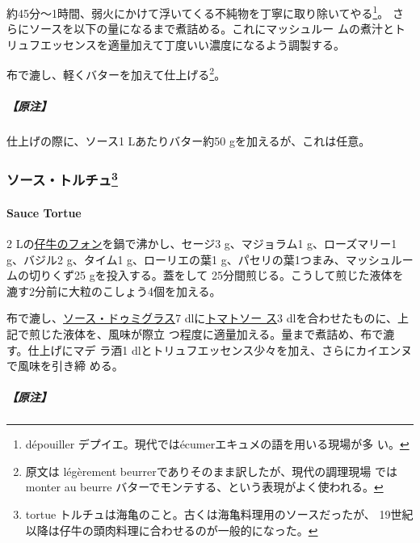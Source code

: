 \begin{recette}
約45分〜1時間、弱火にかけて浮いてくる不純物を丁寧に取り除いてやる\footnote{dépouiller
  デプイエ。現代ではécumerエキュメの語を用いる現場が多 い。}。
さらにソースを\deuxtiers{}以下の量になるまで煮詰める。これにマッシュルー
ムの煮汁とトリュフエッセンスを適量加えて丁度いい濃度になるよう調製する。

布で漉し、軽くバターを加えて仕上げる\footnote{原文は légèrement
  beurrerでありそのまま訳したが、現代の調理現場 ではmonter au beurre
  バターでモンテする、という表現がよく使われる。}。

\hypertarget{ux539fux6ce8-9}{%
\subparagraph{【原注】}\label{ux539fux6ce8-9}}

仕上げの際に、ソース1 Lあたりバター約50 gを加えるが、これは任意。

\maeaki

\hypertarget{ux30bdux30fcux30b9ux30c8ux30ebux30c1ux30e593}{%
\subsubsection[ソース・トルチュ]{\texorpdfstring{ソース・トルチュ\footnote{tortue
  トルチュは海亀のこと。古くは海亀料理用のソースだったが、
  19世紀以降は仔牛の頭肉料理に合わせるのが一般的になった。}}{ソース・トルチュ}}\label{ux30bdux30fcux30b9ux30c8ux30ebux30c1ux30e593}}

\hypertarget{sauce-tortue}{%
\paragraph{Sauce Tortue}\label{sauce-tortue}}

  

2\undemi{}
Lの\protect\hyperlink{fonds-de-veau-brun}{仔牛のフォン}を鍋で沸かし、セージ3
g、マジョラム1 g、ローズマリー1 g、バジル2 g、タイム1 g、ローリエの葉1
g、パセリの葉1つまみ、マッシュルームの切りくず25 gを投入する。蓋をして
25分間煎じる。こうして煎じた液体を漉す2分前に大粒のこしょう4個を加える。

布で漉し、\protect\hyperlink{sauce-demi-glace}{ソース・ドゥミグラス}7
dlに\protect\hyperlink{sauce-tomate}{トマトソー ス}3
dlを合わせたものに、上記で煎じた液体を、風味が際立
つ程度に適量加える。\troisquarts{}量まで煮詰め、布で漉す。仕上げにマデ
ラ酒1 dlとトリュフエッセンス少々を加え、さらにカイエンヌで風味を引き締
める。

\hypertarget{ux539fux6ce8-10}{%
\subparagraph{【原注】}\label{ux539fux6ce8-10}}


\end{recette}
